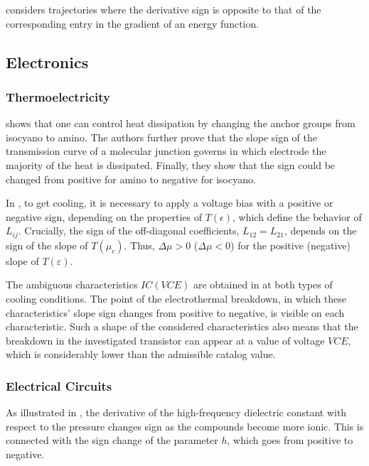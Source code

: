 \documentclass[11pt]{book}
\begin{document}
\cite{hendrickx2019trajectory} considers trajectories where the derivative
sign is opposite to that of the corresponding entry in the gradient
of an energy function.


\subsection{Electronics}


\subsubsection{Thermoelectricity}

\cite{lee2013heat} shows that one can control heat dissipation by
changing the anchor groups from isocyano to amino. The authors further
prove that the slope sign of the transmission curve of a molecular
junction governs in which electrode the majority of the heat is dissipated.
Finally, they show that the sign could be changed from positive for
amino to negative for isocyano.

In \cite{mateos2021thermoelectric}, to get cooling, it is necessary
to apply a voltage bias with a positive or negative sign, depending
on the properties of $T\left(\epsilon\right)$, which define the behavior
of $L_{ij}$. Crucially, the sign of the off-diagonal coefficients,
$L_{12}=L_{21}$, depends on the sign of the slope of $T\left(\mu_{c}\right)$.
Thus, $\Delta\mu>0$ ($\Delta\mu<0$) for the positive (negative)
slope of $T\left(\varepsilon\right)$.

The ambiguous characteristics $IC\left(VCE\right)$ are obtained in
\cite{gorecki2021influence} at both types of cooling conditions.
The point of the electrothermal breakdown, in which these characteristics'
slope sign changes from positive to negative, is visible on each characteristic.
Such a shape of the considered characteristics also means that the
breakdown in the investigated transistor can appear at a value of
voltage $VCE$, which is considerably lower than the admissible catalog
value.


\subsubsection{Electrical Circuits}

As illustrated in \cite{davydov1998pressure}, the derivative of the
high-frequency dielectric constant with respect to the pressure changes
sign as the compounds become more ionic. This is connected with the
sign change of the parameter $h$, which goes from positive to negative.
\end{document}
